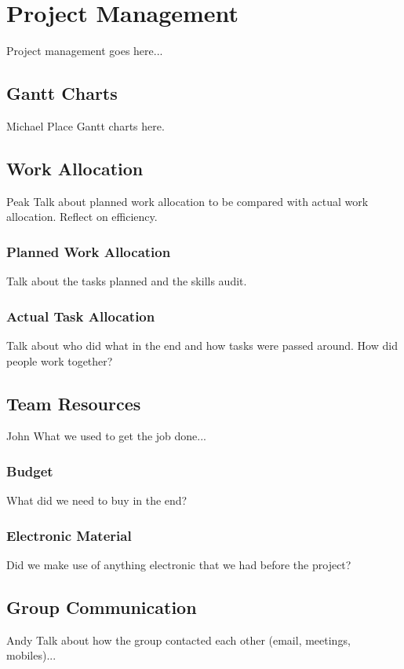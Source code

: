 \chapter{Project Management}
Project management goes here...

\section{Gantt Charts}
Michael
Place Gantt charts here.



\section{Work Allocation}
Peak
Talk about planned work allocation to be compared with actual work allocation. Reflect on efficiency.

\subsection{Planned Work Allocation}
Talk about the tasks planned and the skills audit.

\subsection{Actual Task Allocation}
Talk about who did what in the end and how tasks were passed around. How did people work together?

\section{Team Resources}
John
What we used to get the job done...

\subsection{Budget}
What did we need to buy in the end?

\subsection{Electronic Material}
Did we make use of anything electronic that we had before the project?

\section{Group Communication}
Andy
Talk about how the group contacted each other (email, meetings, mobiles)...



